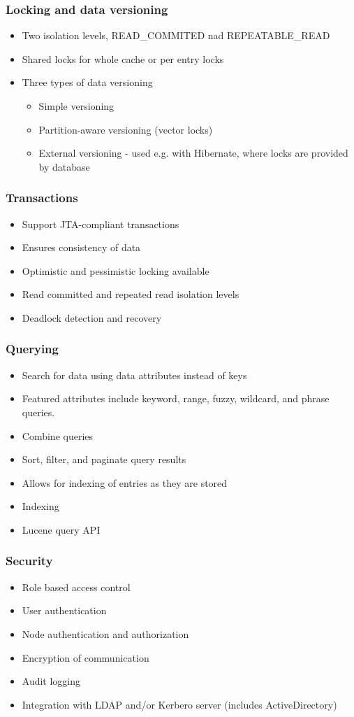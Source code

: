\documentclass[10pt,utf8]{beamer}
\begin{document}
\begin{frame}
	\frametitle{Locking and data versioning}
	\begin{itemize}
	 \item Two isolation levels, READ\_COMMITED nad REPEATABLE\_READ
	 \item Shared locks for whole cache or per entry locks
	 \item Three types of data versioning
	 \begin{itemize}
	  \item Simple versioning
		\item Partition-aware versioning (vector locks)
		\item External versioning - used e.g. with Hibernate, where locks are provided by database
	 \end{itemize}
	\end{itemize}
\end{frame}


\begin{frame}
	\frametitle{Transactions}
	\begin{itemize}
	 \item Support JTA-compliant transactions
	 \item Ensures consistency of data
	 \item Optimistic and pessimistic locking available
	 \item Read committed and repeated read isolation levels
	 \item Deadlock detection and recovery
	\end{itemize}
\end{frame}

\begin{frame}
	\frametitle{Querying}
	\begin{itemize}
	 \item Search for data using data attributes instead of keys
	 \item Featured attributes include keyword, range, fuzzy, wildcard, and phrase queries.
	 \item Combine queries
	 \item Sort, filter, and paginate query results
	 \item Allows for indexing of entries as they are stored
	 \item Indexing
	 \item Lucene query API
	\end{itemize}
\end{frame}

\begin{frame}
	\frametitle{Security}
	\begin{itemize}
	 \item Role based access control
	 \item User authentication
	 \item Node authentication and authorization
	 \item Encryption of communication
	 \item Audit logging
	 \item Integration with LDAP and/or Kerbero server (includes ActiveDirectory)
	\end{itemize}
\end{frame}
\end{document}
